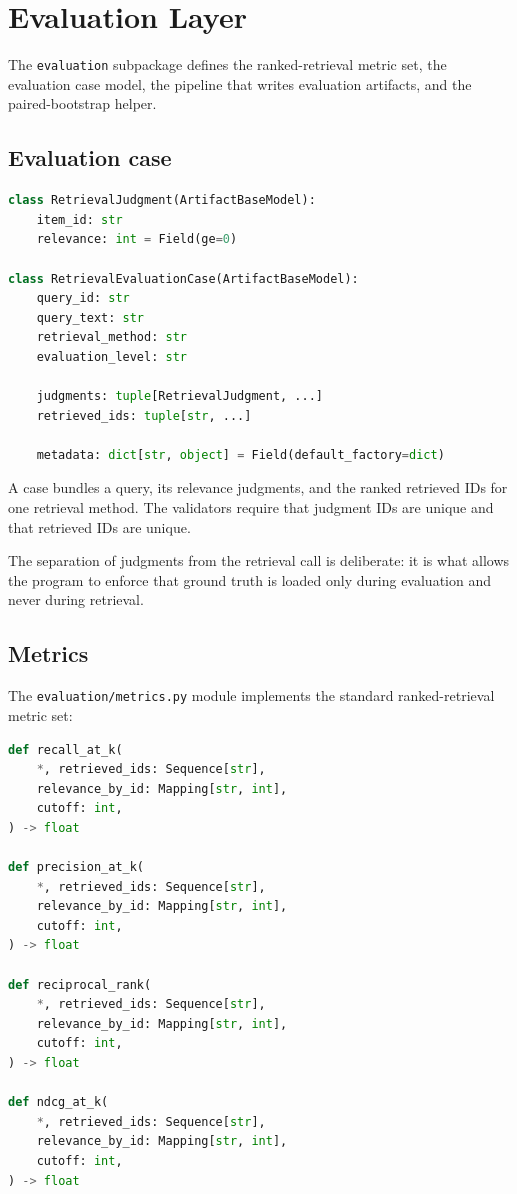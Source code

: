 \documentclass[11pt,a4paper]{article}
\begin{document}
\section{Evaluation Layer}\label{sec:evaluation}

The \texttt{evaluation} subpackage defines the ranked-retrieval metric
set, the evaluation case model, the pipeline that writes evaluation
artifacts, and the paired-bootstrap helper.

\subsection{Evaluation case}
\begin{lstlisting}[language=python]
class RetrievalJudgment(ArtifactBaseModel):
    item_id: str
    relevance: int = Field(ge=0)

class RetrievalEvaluationCase(ArtifactBaseModel):
    query_id: str
    query_text: str
    retrieval_method: str
    evaluation_level: str

    judgments: tuple[RetrievalJudgment, ...]
    retrieved_ids: tuple[str, ...]

    metadata: dict[str, object] = Field(default_factory=dict)
\end{lstlisting}

A case bundles a query, its relevance judgments, and the ranked
retrieved IDs for one retrieval method. The validators require that
judgment IDs are unique and that retrieved IDs are unique.

The separation of judgments from the retrieval call is deliberate:
it is what allows the program to enforce that ground truth is
loaded only during evaluation and never during retrieval.

\subsection{Metrics}
The \texttt{evaluation/metrics.py} module implements the standard
ranked-retrieval metric set:

\begin{lstlisting}[language=python]
def recall_at_k(
    *, retrieved_ids: Sequence[str],
    relevance_by_id: Mapping[str, int],
    cutoff: int,
) -> float

def precision_at_k(
    *, retrieved_ids: Sequence[str],
    relevance_by_id: Mapping[str, int],
    cutoff: int,
) -> float

def reciprocal_rank(
    *, retrieved_ids: Sequence[str],
    relevance_by_id: Mapping[str, int],
    cutoff: int,
) -> float

def ndcg_at_k(
    *, retrieved_ids: Sequence[str],
    relevance_by_id: Mapping[str, int],
    cutoff: int,
) -> float
\end{lstlisting}
\end{document}
